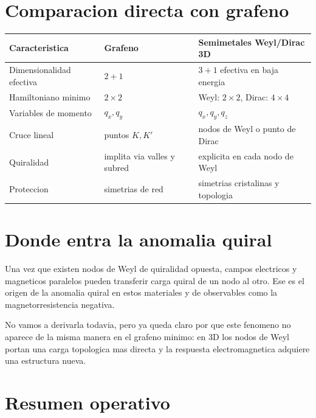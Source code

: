 \section{Comparacion directa con grafeno}

\begin{center}
\begin{tabular}{p{}p{}p{}}
\toprule
\textbf{Caracteristica} & \textbf{Grafeno} & \textbf{Semimetales Weyl/Dirac 3D} \\
\midrule
Dimensionalidad efectiva & \(2+1\) & \(3+1\) efectiva en baja energia \\
Hamiltoniano minimo & \(2\times 2\) & Weyl: \(2\times 2\), Dirac: \(4\times 4\) \\
Variables de momento & \(q_x,q_y\) & \(q_x,q_y,q_z\) \\
Cruce lineal & puntos \(K,K'\) & nodos de Weyl o punto de Dirac \\
Quiralidad & implita via valles y subred & explicita en cada nodo de Weyl \\
Proteccion & simetrias de red & simetrias cristalinas y topologia \\
\bottomrule
\end{tabular}
\end{center}

\section{Donde entra la anomalia quiral}

Una vez que existen nodos de Weyl de quiralidad opuesta, campos electricos y magneticos paralelos pueden transferir carga quiral de un nodo al otro. Ese es el origen de la anomalia quiral en estos materiales y de observables como la magnetorresistencia negativa.

No vamos a derivarla todavia, pero ya queda claro por que este fenomeno no aparece de la misma manera en el grafeno minimo: en 3D los nodos de Weyl portan una carga topologica mas directa y la respuesta electromagnetica adquiere una estructura nueva.

\section{Resumen operativo}

